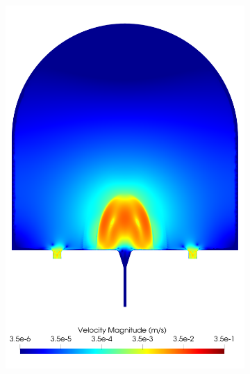 \begin{figure}
\begin{subfigure}[b]{0.3\textwidth}
            \includegraphics[width=\textwidth]{diagrams/results-modelling/velocity-comparison/meshandsoln_dg_velocity_placentone_24_velocity-log.png}
            \caption{}
            \label{fig:4-models-placentone-norm-log:24}
        \end{subfigure}
        \hfill
        \begin{subfigure}[b]{0.3\textwidth}
            \centering

\end{subfigure}
\end{figure}
